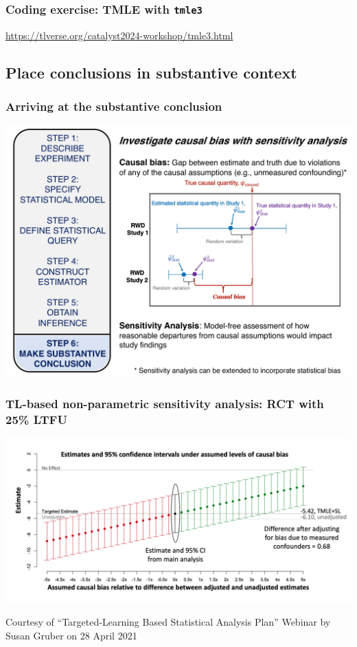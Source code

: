 \documentclass[t]{beamer}
\begin{document}
\begin{frame}
  \frametitle{Coding exercise: TMLE with \texttt{tmle3}}
  \url{https://tlverse.org/catalyst2024-workshop/tmle3.html}
\end{frame}

\subsection{Place conclusions in substantive context}

\begin{frame}
\frametitle{Arriving at the substantive conclusion}
\vspace{-16pt}
  \begin{center}
  \includegraphics[width = 1.02\textwidth]{figures/roadmap6.pdf}
  \end{center}
\end{frame}

\begin{frame}
\frametitle{TL-based non-parametric sensitivity analysis: RCT with 25\% LTFU}
\vspace{-10pt}
  \begin{center}
  \includegraphics[width = 1.05\textwidth]{figures/gruber_sensitivity.png}
  \end{center}
  \vspace{35pt}
\tiny{Courtesy of ``Targeted-Learning Based Statistical Analysis Plan'' Webinar by Susan Gruber on 28 April 2021}
\end{frame}
\end{document}
